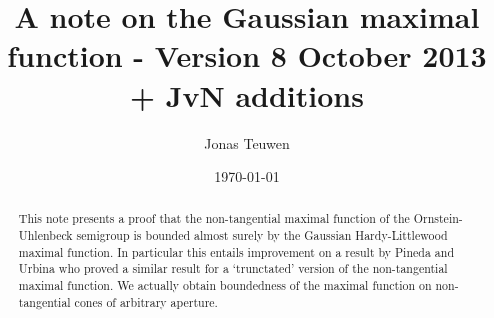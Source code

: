 \documentclass[a4paper,oneside,10pt]{amsproc}
\title[Gaussian maximal functions]{A note on the Gaussian maximal
  function - Version 8 October 2013 + JvN additions}
\author{Jonas Teuwen}%
\date{\today}
\theoremstyle{remark}
\begin{document}
\begin{abstract}
  This note presents a proof that 
  the non-tangential maximal function of the Ornstein-Uhlenbeck semigroup
  is bounded almost surely by the Gaussian Hardy-Littlewood maximal
  function.  In particular this entails improvement on a result by
  Pineda and Urbina \cite{Pineda2008} who proved a similar result for 
  a `trunctated' version of the non-tangential maximal function. 
  We actually obtain boundedness of the maximal function on non-tangential
  cones of arbitrary aperture.
\end{abstract}


\maketitle
\end{document}
